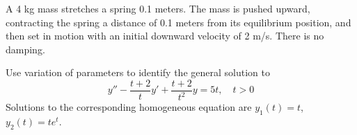 \documentclass[12pt]{exam}
\begin{document}
\begin{questions}
    \question[10] A 4 kg mass stretches a spring 0.1 meters. The mass is pushed upward, contracting the spring a distance of 0.1 meters from its equilibrium position, and then set in motion with an initial downward velocity of 2 m/s. There is no damping. 
    
    \newpage \InitialsRight 
    \Scratch 

    \newpage \InitialsLeft

    \question[8] Use variation of parameters to identify the general solution to $$y'' - \frac{t+2}{t}y' + \frac{t+2}{t^2}y = 5t, \quad t > 0$$ Solutions to the corresponding homogeneous equation are $y_1(t) = t$, $y_2(t) = te^t$. 
    

\end{questions}
    
\newpage \InitialsRight
\LastPage 
\end{document}
